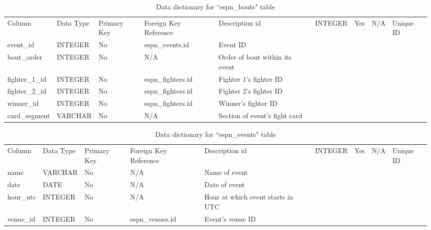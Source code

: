 \documentclass[12pt,twoside]{report}
\begin{document}
\tiny 
\begin{longtable}{lllll}
\caption{Data dictionary for ``espn\_bouts" table}\\ 
\toprule
Column         & Data Type & Primary Key & Foreign Key Reference & Description                     \endfirsthead 
\toprule
id             & INTEGER   & Yes         & N/A                   & Unique ID                       \\
event\_id      & INTEGER   & No          & espn\_events.id       & Event ID                        \\
bout\_order    & INTEGER   & No          & N/A                   & Order of bout within its event  \\
fighter\_1\_id & INTEGER   & No          & espn\_fighters.id     & Fighter 1's fighter ID          \\
fighter\_2\_id & INTEGER   & No          & espn\_fighters.id     & Fighter 2's fighter ID          \\
winner\_id     & INTEGER   & No          & espn\_fighters.id     & Winner's fighter ID             \\
card\_segment  & VARCHAR   & No          & N/A                   & Section of event's fight card   \\
\bottomrule
\end{longtable}
\normalsize

\tiny 
\begin{longtable}{lllll}
\caption{Data dictionary for ``espn\_events" table}\\ 
\toprule
Column    & Data Type & Primary Key & Foreign Key Reference & Description                        \endfirsthead 
\toprule
id        & INTEGER   & Yes         & N/A                   & Unique ID                          \\
name      & VARCHAR   & No          & N/A                   & Name of event                      \\
date      & DATE      & No          & N/A                   & Date of event                      \\
hour\_utc & INTEGER   & No          & N/A                   & Hour at which event starts in UTC  \\
venue\_id & INTEGER   & No          & espn\_venues.id       & Event's venue ID                   \\
\bottomrule
\end{longtable}
\normalsize
\end{document}
